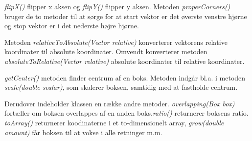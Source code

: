 \emph{flipX()} flipper x aksen og \emph{flipY()} flipper y aksen. Metoden \emph{properCorners()} bruger de to metoder til at sørge for at start vektor er det øverste venstre hjørne og stop vektor er i det nederste højre hjørne.

Metoden \emph{relativeToAbsolute(Vector relative)} konverterer vektorens relative koordinater til absolute koordinater. Omvendt konverterer metoden \emph{absoluteToRelative(Vector relative)} absolute koordinater til relative koordinater.

\emph{getCenter()} metoden finder centrum af en boks. Metoden indgår bl.a. i metoden \emph{scale(double scalar)}, som skalerer boksen, samtidig med at fastholde centrum. 

Derudover indeholder klassen en række andre metoder. \emph{overlapping(Box box)} fortæller om boksen overlappes af en anden boks.\emph{ratio()} returnerer boksens ratio.  \emph{toArray()} returnerer koodinaterne i et to-dimensionelt array, \emph{grow(double amount)} får boksen til at vokse i alle retninger m.m.